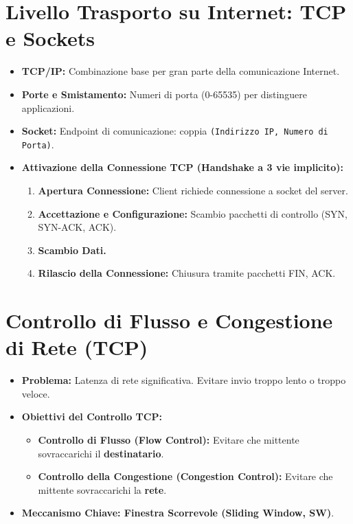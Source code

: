 \section{Livello Trasporto su Internet: TCP e Sockets}
\begin{itemize}
    \item \textbf{TCP/IP:} Combinazione base per gran parte della comunicazione Internet.
    \item \textbf{Porte e Smistamento:} Numeri di porta (0-65535) per distinguere applicazioni.
    \item \textbf{Socket:} Endpoint di comunicazione: coppia \texttt{(Indirizzo IP, Numero di Porta)}.
    \item \textbf{Attivazione della Connessione TCP (Handshake a 3 vie implicito):}
    \begin{enumerate}
        \item \textbf{Apertura Connessione:} Client richiede connessione a socket del server.
        \item \textbf{Accettazione e Configurazione:} Scambio pacchetti di controllo (SYN, SYN-ACK, ACK).
        \item \textbf{Scambio Dati.}
        \item \textbf{Rilascio della Connessione:} Chiusura tramite pacchetti FIN, ACK.
    \end{enumerate}
\end{itemize}

\section{Controllo di Flusso e Congestione di Rete (TCP)}
\begin{itemize}
    \item \textbf{Problema:} Latenza di rete significativa. Evitare invio troppo lento o troppo veloce.
    \item \textbf{Obiettivi del Controllo TCP:}
    \begin{itemize}
        \item \textbf{Controllo di Flusso (Flow Control):} Evitare che mittente sovraccarichi il \textbf{destinatario}.
        \item \textbf{Controllo della Congestione (Congestion Control):} Evitare che mittente sovraccarichi la \textbf{rete}.
    \end{itemize}
    \item \textbf{Meccanismo Chiave: Finestra Scorrevole (Sliding Window, SW)}.
\end{itemize}

